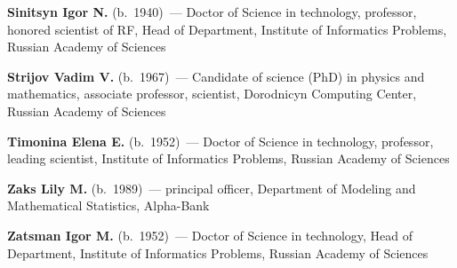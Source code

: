 \begin{multicols}{2}
\vspace*{4pt}

\noindent
\textbf{Sinitsyn Igor N.} (b.\ 1940)~--- Doctor of Science in technology, 
professor, honored scientist of RF, Head of Department,
Institute of Informatics Problems, Russian Academy of Sciences

\vspace*{4pt}

\noindent
\textbf{Strijov Vadim V.} (b.\ 1967)~--- Candidate of science (PhD) in physics and 
mathematics, associate professor, scientist, Dorodnicyn Computing Center, Russian 
Academy of Sciences 


\vspace*{4pt}

\noindent
\textbf{Timonina Elena E.} (b.\ 1952)~--- Doctor of Science in technology, professor, 
leading scientist, Institute of Informatics Problems, Russian Academy of Sciences

\vspace*{4pt}

\noindent
\textbf{Zaks Lily M.} (b.\ 1989)~--- principal officer, Department of Modeling and 
Mathematical Statistics, Alpha-Bank

\vspace*{4pt}

\noindent
\textbf{Zatsman Igor M.} (b.\ 1952)~--- Doctor of Science in technology, Head of Department, 
Institute of Informatics Problems, Russian Academy of Sciences




\end{multicols}
\newpage